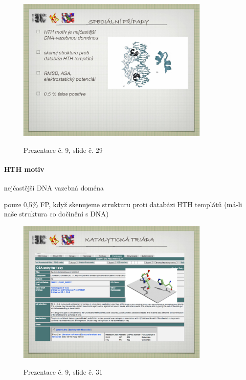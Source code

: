 \documentclass[DIV=8]{scrreprt}
\begin{document}
\begin{figure}
    \caption{Prezentace č. 9, slide č. 29}
    \includegraphics[width=0.85\textwidth]{slides-9/slide-29.jpg}
    \centering
    \label{slides-9-slide-29}
\end{figure}

\paragraph{HTH motiv}
\begin{myItemize}[nosep]
    \item nejčastější DNA vazebná doména
    \item pouze 0,5\% FP, když skenujeme strukturu proti databázi HTH templátů (má-li naše struktura co dočinění s DNA)
\end{myItemize}



\begin{figure}
    \caption{Prezentace č. 9, slide č. 31}
    \includegraphics[width=0.85\textwidth]{slides-9/slide-31.jpg}
    \centering
    \label{slides-9-slide-31}
\end{figure}
\end{document}
